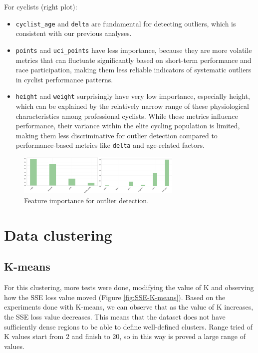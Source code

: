 \documentclass[a4paper, twoside]{article}
\begin{document}
For cyclists (right plot):
\begin{itemize}
    \item \texttt{cyclist\_age} and \texttt{delta} are fundamental for detecting outliers, which is consistent with our previous analyses.
    \item \texttt{points} and \texttt{uci\_points} have less importance, because they are more volatile metrics that can fluctuate significantly based on short-term performance and race participation, making them less reliable indicators of systematic outliers in cyclist performance patterns.
    \item \texttt{height} and \texttt{weight} surprisingly have very low importance, especially height, which can be explained by the relatively narrow range of these physiological characteristics among professional cyclists. While these metrics influence performance, their variance within the elite cycling population is limited, making them less discriminative for outlier detection compared to performance-based metrics like \texttt{delta} and age-related factors.
\end{itemize}
\begin{figure}[ht]
    \centering
    \includegraphics[width=0.7\textwidth]{assets/feature_importance.png}
    \caption{Feature importance for outlier detection.}
    \label{fig:feature_importance}
\end{figure}
\section{Data clustering}

\subsection{K-means}

For this clustering, more tests were done, modifying the value of K and observing how the SSE loss value moved (Figure \ref{fig:SSE-K-means}). Based on the experiments done with K-means, we can observe that as the value of K increases, the SSE loss value decreases. This means that the dataset does not have sufficiently dense regions to be able to define well-defined clusters.
Range tried of K values start from 2 and finish to 20, so in this way is proved a large range of values.
\end{document}
